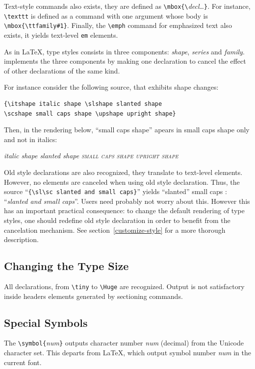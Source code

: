 Text-style commands also exists, they are defined as
\verb+\mbox{\+\textit{decl}\ldots\verb+}+. For instance,
\verb+\texttt+ is defined as a command with one argument whose body is
\verb+\mbox{\ttfamily#1}+.
Finally, the \verb+\emph+ command for emphasized text also exists,
it yields text-level \verb+em+ elements.


As in \LaTeX{}, type styles consists in three components:
\emph{shape}, \emph{series} and \emph{family}.
\hevea{} implements the three components by making one declaration to
cancel the effect of other declarations of the same kind.
\begin{htmlonly}
For instance consider the following source, that exhibits shape changes:
\begin{verbatim}
{\itshape italic shape \slshape slanted shape
\scshape small caps shape \upshape upright shape}
\end{verbatim}
Then, in the rendering below, ``small caps shape'' apears in small caps shape
only and not in italics:
\begin{htmlout}
{\itshape italic shape \slshape slanted shape
\scshape small caps shape \upshape upright shape}
\end{htmlout}
\end{htmlonly}


Old style declarations are also recognized, they translate to
text-level elements. However, no elements are canceled when using
old style declaration. Thus, the source
``\verb+{\sl\sc slanted and small caps}+'' yields ``slanted'' small caps
\ifhevea: ``{\sl\sc slanted and small caps}''\fi.
Users need probably not worry about this. However this has an
important practical consequence: to change the default rendering of
type styles, one should redefine old style declaration in order to
benefit from the cancelation mechanism. See
section~\ref{customize-style} for a more thorough description.


\subsection{Changing the Type Size}
All declarations, from \verb+\tiny+ to \verb+\Huge+ are recognized.
Output is not satisfactory inside headers elements
generated by sectioning commands.

\subsection{Special Symbols}

The \verb+\symbol{+{\it num}\verb+}+ outputs character number {\it num}
(decimal) from the Unicode character set.
This departs from \LaTeX{}, which output symbol number \textit{num} in
the current font.

